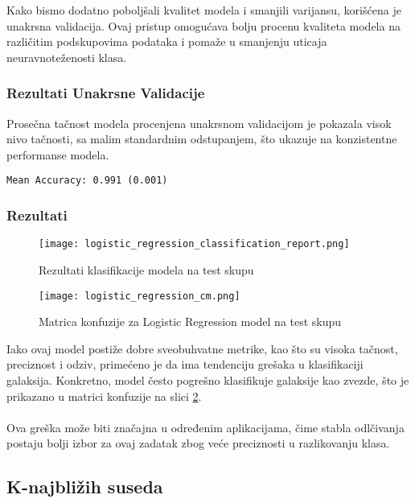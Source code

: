 \documentclass[a4paper,12pt]{article}
\begin{document}
Kako bismo dodatno poboljšali kvalitet modela i smanjili varijansu, korišćena je unakrsna validacija. Ovaj pristup omogućava bolju procenu kvaliteta modela na različitim podskupovima podataka i pomaže u smanjenju uticaja neuravnoteženosti klasa.

\subsubsection{Rezultati Unakrsne Validacije}
Prosečna tačnost modela procenjena unakrsnom validacijom je pokazala visok nivo tačnosti, sa malim standardnim odstupanjem, što ukazuje na konzistentne performanse modela.

\begin{verbatim}
Mean Accuracy: 0.991 (0.001)
\end{verbatim}

\clearpage

\subsubsection{Rezultati}

\begin{figure}[h!]
\centering
\texttt{[image: logistic\_regression\_classification\_report.png]}
\caption{Rezultati klasifikacije modela na test skupu}
\label{fig:logistic_regression_classification_report}
\end{figure}

\begin{figure}[h!]
\centering
\texttt{[image: logistic\_regression\_cm.png]}
\caption{Matrica konfuzije za Logistic Regression model na test skupu}
\label{fig:logistic_regression_cm}
\end{figure}

Iako ovaj model postiže dobre sveobuhvatne metrike, kao što su visoka tačnost, preciznost i odziv, primećeno je da ima tendenciju grešaka u klasifikaciji galaksija. Konkretno, model često pogrešno klasifikuje galaksije kao zvezde, što je prikazano u matrici konfuzije na slici \ref{fig:logistic_regression_cm}.\\\\
Ova greška može biti značajna u određenim aplikacijama, čime stabla odlčivanja postaju bolji izbor za ovaj zadatak zbog veće preciznosti u razlikovanju klasa.

\subsection{K-najbližih suseda}
\end{document}
